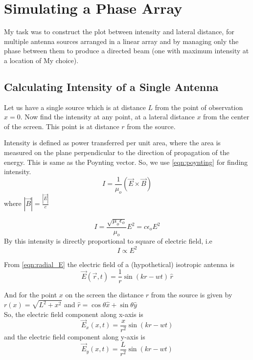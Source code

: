 \chapter{Simulating a Phase Array}


My task was to construct the plot between intensity and lateral distance, for multiple antenna sources arranged in a linear array and by managing only the phase between them to produce a directed beam (one with maximum intensity at a location of My choice).

\section{Calculating Intensity of a Single Antenna}

Let us have a single source which is at distance $L$ from the point of observation $x = 0$. Now find the intensity at any point, at a lateral distance $x$ from the center of the screen. This point is at distance $r$ from the source.

Intensity is defined as power transferred per unit area, where the area is measured on the plane perpendicular to the direction of propagation of the energy. This is same as the Poynting vector. So, we use \eqref{eqn:poynting} for finding intensity.
%
\begin{equation}
   I = \frac{1}{\mu_{o}}(\vec{E}\times\vec{B})
\end{equation}
%
where $\displaystyle |\vec{B}| = \frac{|\vec{E}|}{c}$

\begin{equation}
      I = \frac{\sqrt{\mu_{o}{\epsilon_{o}}}}{\mu_{o}}E^2 
        = c\epsilon_{o}E^2
\end{equation}
%
By this intensity is directly proportional to square of electric field, i.e
%
\begin{equation}
   I \propto E^2
\end{equation}

From \eqref{eqn:radial_E} the electric field of a (hypothetical) isotropic antenna is
%
\begin{equation}
   \vec{E}(\vec{r},t) = \frac{1}{r}\sin(kr-wt) \, \hat{r}
\end{equation}

And for the point $x$ on the screen the distance $r$ from the source is given by $r(x) = \sqrt{L^2+x^2}$ and $\hat{r} = \cos\theta\hat{x}+\sin\theta\hat{y}$\\

So, the electric field component along x-axis is
%
\begin{equation}
\vec{E}_x(x,t) = \frac{x}{r^2}\sin(kr-wt)
\end{equation}
%
and the electric field component along y-axis is
%
\begin{equation}
\vec{E}_y(x,t) = \frac{L}{r^2}\sin(kr-wt)
\end{equation}

